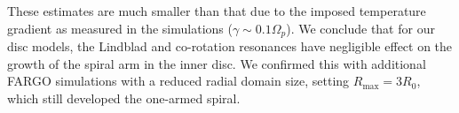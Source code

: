 These estimates are much smaller than that due to
the imposed temperature gradient as measured in the simulations
($\gamma\sim 0.1\Omega_p$). We conclude that for our disc models, the
Lindblad and co-rotation resonances have negligible effect on the
growth of the spiral arm in the inner disc. We confirmed this with
additional FARGO simulations with a reduced radial domain size,
setting $R_\mathrm{max}=3R_0$, which still developed the one-armed
spiral. 








